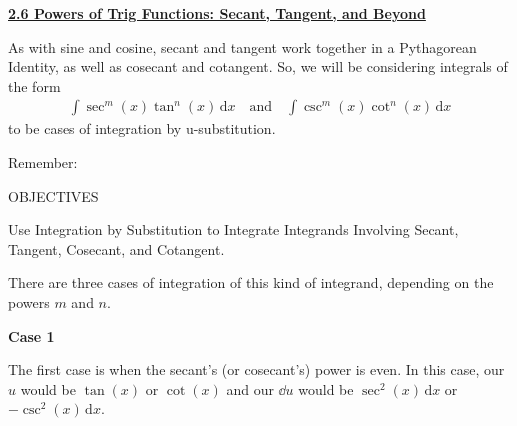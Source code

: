 \textbf{\underline{\large{2.6 Powers of Trig Functions: Secant, Tangent, and Beyond}}} \par

As with sine and cosine, secant and tangent work together in a Pythagorean Identity, as well as cosecant and cotangent. So, we will be considering integrals of the form \begin{align*}
    \int \sec^m (x)\tan^n (x) \,\mathrm{d}x \quad \text{and} \quad \int \csc^m (x)\cot^n (x) \,\mathrm{d}x
\end{align*}
to be cases of integration by u-substitution. \par

Remember: \par


\begin{tcolorbox}[objective]
    \begin{center}
        OBJECTIVES \\[11pt]
    \end{center}
    Use Integration by Substitution to Integrate Integrands Involving Secant, Tangent, Cosecant, and Cotangent.
\end{tcolorbox}

There are three cases of integration of this kind of integrand, depending on the powers $m$ and $n$. \par

\textbf{Case 1} \par

The first case is when the secant's (or cosecant's) power is even. In this case, our $u$ would be $\tan (x)$ or $\cot (x)$ and our $\dd u$ would be $\sec^2 (x) \,\mathrm{d}x$ or $-\csc^2 (x) \,\mathrm{d}x$. \par

